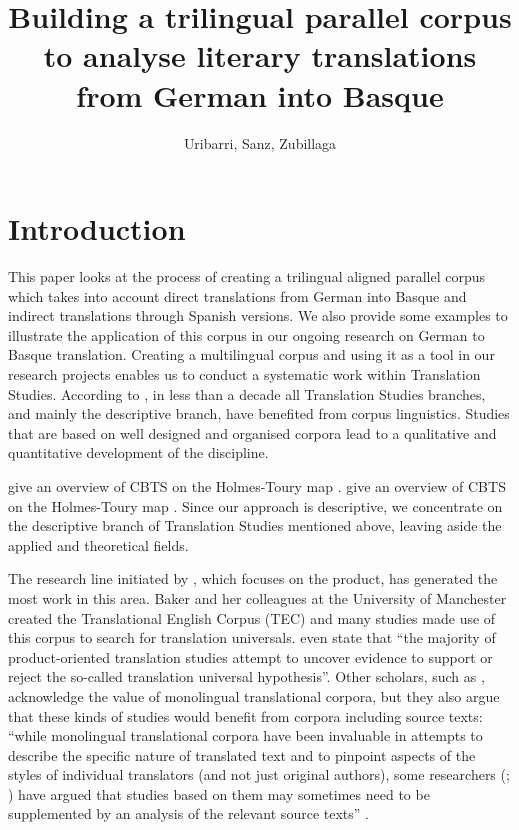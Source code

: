 \documentclass[output=paper]{LSP/langsci}
\author{Uribarri, Sanz, Zubillaga}
\title{Building a trilingual parallel corpus to analyse literary translations from German into Basque}
\begin{document}
\section{Introduction}
  
This paper looks at the process of creating a trilingual aligned parallel corpus which takes into account direct translations from German into Basque and indirect translations through Spanish versions. We also provide some examples to illustrate the application of this corpus in our ongoing research on German to Basque translation. Creating a multilingual corpus and using it as a tool in our research projects enables us to conduct a systematic work within Translation Studies. According to \citet[216]{Corpas2008}, in less than a decade all Translation Studies branches, and mainly the descriptive branch, have benefited from corpus linguistics. Studies that are based on well designed and organised corpora lead to a qualitative and quantitative development of the discipline.

\citet{Xiao2009} give an overview of CBTS on the Holmes-Toury map \citep[243]{Xiao2009}. \citet{Xiao2009} give an overview of CBTS on the Holmes-Toury map \citep[243]{Xiao2009}. Since our approach is descriptive, we concentrate on the descriptive branch of Translation Studies mentioned above, leaving aside the applied and theoretical fields.

The research line initiated by \citet{Baker1993}, which focuses on the product, has generated the most work in this area. Baker and her colleagues at the University of Manchester created the Translational English Corpus (TEC) and many studies \citep[e.g.][]{Lavios1998b,Olohan2000,Olohan2003} made use of this corpus to search for translation universals. \citet[244]{Xiao2009} even state that “the majority of product-oriented translation studies attempt to uncover evidence to support or reject the so-called translation universal hypothesis”. Other scholars, such as \citet{Kenny2001}, acknowledge the value of monolingual translational corpora, but they also argue that these kinds of studies would benefit from corpora including source texts: “while monolingual translational corpora have been invaluable in attempts to describe the specific nature of translated text and to pinpoint aspects of the styles of individual translators (and not just original authors), some researchers (\citealt[565]{Lavios1998b}; \citealt[565]{Puurtinen1998}) have argued that studies based on them may sometimes need to be supplemented by an analysis of the relevant source texts” \citep[62]{Kenny2001}.
\end{document}
